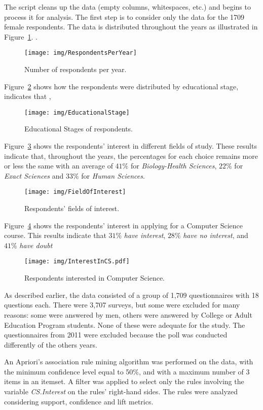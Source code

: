 The script cleans up the data (empty columns, whitespaces, etc.) and begins to process it for analysis. The first step is to consider only the data for the 1709 female respondents. The data is distributed throughout the years as illustrated in Figure~\ref{fig:RespondentsPerYear}. .

\begin{figure}[h!]%
\texttt{[image: img/RespondentsPerYear]}%
\caption{Number of respondents per year.}%
\label{fig:RespondentsPerYear}%
\end{figure}%

Figure~\ref{fig:EducationalStage} shows how the respondents were distributed by educational stage, indicates that ,

\begin{figure}[h!]%
\texttt{[image: img/EducationalStage]}%
\caption{Educational Stages of respondents.}%
\label{fig:EducationalStage}%
\end{figure}%

Figure~\ref{fig:FieldOfInterest} shows the respondents' interest in different fields of study. These results indicate that, throughout the years, the percentages for each choice remains more or less the same with an average of $41\%$ for \emph{Biology-Health Sciences}, $22\%$ for \emph{Exact Sciences} and $33\%$ for \emph{Human Sciences}.

\begin{figure}[h!]%
\texttt{[image: img/FieldOfInterest]}%
\caption{Respondents' fields of interest.}%
\label{fig:FieldOfInterest}%
\end{figure}%

Figure~\ref{fig:InterestInCS.pdf} shows the respondents' interest in applying for a Computer Science course. This results indicate that $31\%$  \emph{have interest}, $28\%$  \emph{have no interest}, and $41\%$  \emph{have doubt}

\begin{figure}[h!]%
\texttt{[image: img/InterestInCS.pdf]}%
\caption{Respondents interested in Computer Science.}%
\label{fig:InterestInCS.pdf}%
\end{figure}%

As described earlier, the data consisted of a group of 1,709 questionnaires with 18 questions each. There were 3,707 surveys, but some were excluded for many reasons: some were answered by men, others were answered by College or Adult Education Program students. None of these were adequate for the study. The questionnaires from 2011 were excluded because the poll was conducted differently of the others years.

An Apriori's association rule mining algorithm was performed on the data, with the minimum confidence level equal to 50\%, and with a maximum number of 3 items in an itemset. A filter was applied to select only the rules involving the variable \emph{CS.Interest} on the rules' right-hand sides. The rules were analyzed considering support, confidence and lift metrics.
